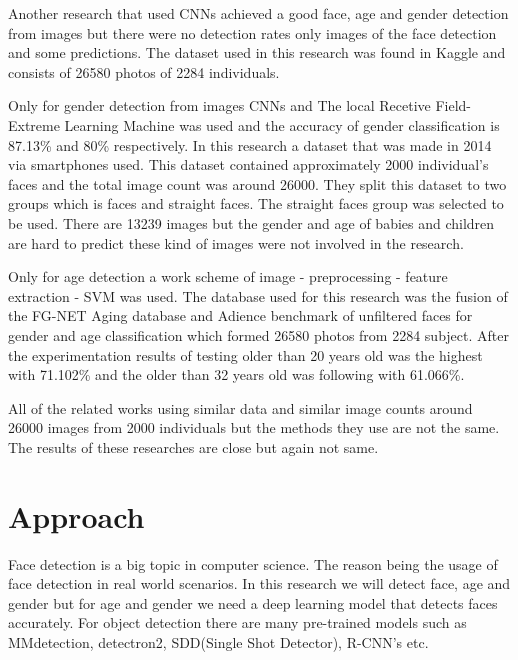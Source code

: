 \documentclass[conference]{IEEEtran}
\begin{document}
\bigskip

Another research that used CNNs achieved a good face, age and gender detection from images but there were no detection rates only images of the face detection and some predictions. The dataset used in this research was found in Kaggle and consists of 26580 photos of 2284 individuals. \cite{b5}

\bigskip

Only for gender detection from images CNNs and The local Recetive Field-Extreme Learning Machine was used and the accuracy of gender classification is 87.13\% and 80\% respectively. In this research a dataset that was made in 2014 via smartphones used. This dataset contained approximately 2000 individual's faces and the total image count was around 26000. They split this dataset to two groups which is faces and straight faces. The straight faces group was selected to be used. There are 13239 images but the gender and age of babies and children are hard to predict these kind of images were not involved in the research.\cite{b2}

\bigskip

Only for age detection a work scheme of image - preprocessing - feature extraction - SVM was used. The database used for this research was the fusion of the FG-NET Aging database and Adience benchmark of unfiltered faces for gender and age classification which formed 26580 photos from 2284 subject. After the experimentation results of testing older than 20 years old was the highest with 71.102\% and the older than 32 years old was following with 61.066\%. \cite{b3}

\bigskip

All of the related works using similar data and similar image counts around 26000 images from 2000 individuals but the methods they use are not the same. The results of these researches are close but again not same.

\section{Approach}

Face detection is a big topic in computer science. The reason being the usage of face detection in real world scenarios. In this research we will detect face, age and gender but for age and gender we need a deep learning model that detects faces accurately. For object detection there are many pre-trained models such as MMdetection, detectron2, SDD(Single Shot Detector), R-CNN's etc.
\end{document}
